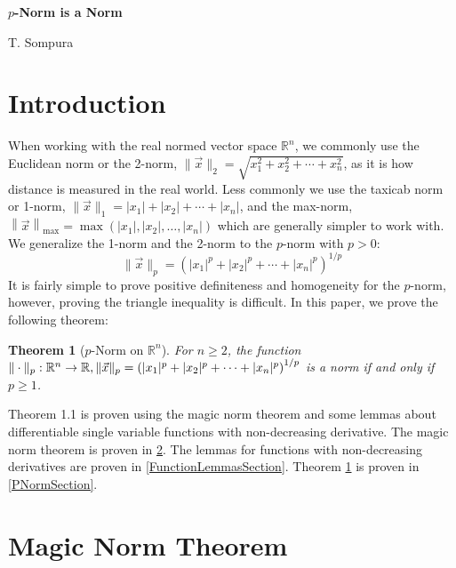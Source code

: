\documentclass{article}
\newcommand{\R}{\mathbb{R}}
\newcommand{\maxnorm}[1]{\left\|#1\right\|_{\text{max}}}
\theoremstyle{plain} %
\newtheorem{thm}{Theorem}
\numberwithin{thm}{section} %
\theoremstyle{definition} %
\begin{document}
\begin{center}
    {\Large \textbf{$p$-Norm is a Norm}}

    \medskip
    {\large T. Sompura}
\end{center}

\begin{abstract}
    We show that the $p$-norm in $\R^n$ is indeed a norm. We state and prove the ``magic norm" theorem, and we analyse a certain type of a single variable function to help prove that $p$-norm is a norm. Then, we apply our $p$-norm theorem on $\R^n$ to prove the $p$-norms on the spaces of sequences and continuous functions.
\end{abstract}

\section{Introduction}

When working with the real normed vector space $\R^n$, we commonly use the Euclidean norm or the 2-norm, $\|\vec{x}\|_2 = \sqrt{x_1^2 + x_2^2 + \cdots + x_n^2}$, as it is how distance is measured in the real world. Less commonly we use the taxicab norm or 1-norm, $\|\vec{x}\|_1 = |x_1| + |x_2| + \cdots + |x_n|$, and the max-norm, $\maxnorm{\vec{x}} = \max(|x_1|, |x_2|, \dots, |x_n|)$ which are generally simpler to work with. We generalize the 1-norm and the 2-norm to the $p$-norm with $p > 0$:
\[
    \|\vec{x}\|_p = \left(|x_1|^p + |x_2|^p + \cdots + |x_n|^p\right)^{1/p}
\]
It is fairly simple to prove positive definiteness and homogeneity for the $p$-norm, however, proving the triangle inequality is difficult. In this paper, we prove the following theorem:
\begin{thm}[$p$-Norm on $\R^n$]
    \label{PNormTheorem}
    For $n \geq 2$, the function $\|\cdot\|_p: \R^n \to \R,\\ \|\vec{x}\|_p = \left(|x_1|^p + |x_2|^p + \cdots + |x_n|^p\right)^{1/p}$ is a norm if and only if $p \geq 1$.
\end{thm}
Theorem 1.1 is proven using the magic norm theorem and some lemmas about differentiable single variable functions with non-decreasing derivative. The magic norm theorem is proven in \textsection\ref{MagicNormSection}. The lemmas for functions with non-decreasing derivatives are proven in \textsection\ref{FunctionLemmasSection}. Theorem \ref{PNormTheorem} is proven in \textsection\ref{PNormSection}.

\section{Magic Norm Theorem}\label{MagicNormSection}
\end{document}
